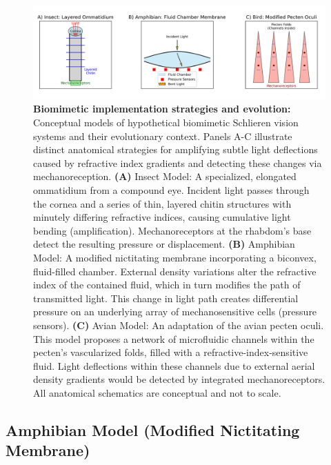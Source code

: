 \documentclass[11pt]{article}
\begin{document}
\begin{figure}[htbp]
    \centering
    \includegraphics[width=\textwidth]{figures/figure5_biomimetic_schlieren_corrected.png}
    \caption{\textbf{Biomimetic implementation strategies and evolution:} Conceptual models of hypothetical biomimetic Schlieren vision systems and their evolutionary context. Panels A-C illustrate distinct anatomical strategies for amplifying subtle light deflections caused by refractive index gradients and detecting these changes via mechanoreception.
    \textbf{(A)} Insect Model: A specialized, elongated ommatidium from a compound eye. Incident light passes through the cornea and a series of thin, layered chitin structures with minutely differing refractive indices, causing cumulative light bending (amplification). Mechanoreceptors at the rhabdom's base detect the resulting pressure or displacement.
    \textbf{(B)} Amphibian Model: A modified nictitating membrane incorporating a biconvex, fluid-filled chamber. External density variations alter the refractive index of the contained fluid, which in turn modifies the path of transmitted light. This change in light path creates differential pressure on an underlying array of mechanosensitive cells (pressure sensors).
    \textbf{(C)} Avian Model: An adaptation of the avian pecten oculi. This model proposes a network of microfluidic channels within the pecten's vascularized folds, filled with a refractive-index-sensitive fluid. Light deflections within these channels due to external aerial density gradients would be detected by integrated mechanoreceptors.
    All anatomical schematics are conceptual and not to scale.}
    \label{fig:biomimetic_strategies_evolution} %
\end{figure}


\subsection{Amphibian Model (Modified Nictitating Membrane)}
\end{document}
